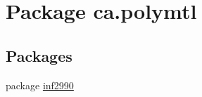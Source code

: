 \hypertarget{namespaceca_1_1polymtl}{\section{Package ca.\-polymtl}
\label{namespaceca_1_1polymtl}
}
\subsection*{Packages}
\begin{DoxyCompactItemize}
\item 
package \hyperlink{namespaceca_1_1polymtl_1_1inf2990}{inf2990}
\end{DoxyCompactItemize}
